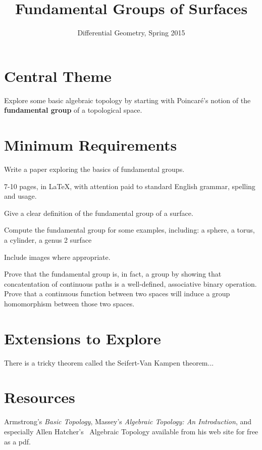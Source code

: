 \documentclass[12pt]{amsart}
\begin{document}
\title{Fundamental Groups of Surfaces}
\author{Differential Geometry, Spring 2015}

\maketitle

\section*{Central Theme}

Explore some basic algebraic topology by starting with Poincar\'{e}'s notion of the \textbf{fundamental group} of a topological space.

\section*{Minimum Requirements}

Write a paper exploring the basics of fundamental groups. 
\begin{compactitem}
\item 7-10 pages, in \LaTeX, with attention paid to standard English grammar, spelling and usage.
\item Give a clear definition of the fundamental group of a surface.
\item Compute the fundamental group for some examples, including: a sphere, a torus, a cylinder, a genus 2 surface
\item Include images where appropriate.
\item Prove that the fundamental group is, in fact, a group by showing that concatentation of continuous paths is a well-defined, associative binary operation. Prove that a continuous function between two spaces will induce a group homomorphism between those two spaces.
\end{compactitem}


\section*{Extensions to Explore}

There is a tricky theorem called the Seifert-Van Kampen theorem...

\section*{Resources}

Armstrong's \emph{Basic Topology}, Massey's \emph{Algebraic Topology: An Introduction}, and especially Allen Hatcher's \ {Algebraic Topology} available from his web site for free as a pdf.
\end{document}
